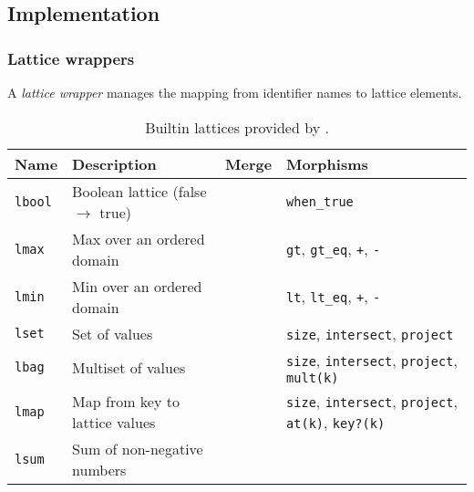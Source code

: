 \subsection{Implementation}

\subsubsection{Lattice wrappers}
A \emph{lattice wrapper} manages the mapping from identifier names to lattice
elements.

\begin{table*}[t]
\begin{tabular}{|l|l|l|l|}
\hline
\textbf{Name} & \textbf{Description} & \textbf{Merge} & \textbf{Morphisms} \\
\hline
\texttt{lbool} & Boolean lattice (false $\to$ true) & & \texttt{when\_true} \\
\texttt{lmax} & Max over an ordered domain & &\texttt{gt},
\texttt{gt\_eq}, \texttt{+}, \texttt{-} \\
\texttt{lmin} & Min over an ordered domain & &\texttt{lt}, \texttt{lt\_eq},
\texttt{+}, \texttt{-} \\
\texttt{lset} & Set of values & &\texttt{size}, \texttt{intersect}, \texttt{project}
\\
\texttt{lbag} & Multiset of values & &\texttt{size}, \texttt{intersect},
\texttt{project}, \texttt{mult(k)}\\
\texttt{lmap} & Map from key to lattice values & &\texttt{size},
\texttt{intersect}, \texttt{project}, \texttt{at(k)}, \texttt{key?(k)} \\
\texttt{lsum} & Sum of non-negative numbers & &\\
\hline
\end{tabular}
\caption{Builtin lattices provided by \lang.}
\label{tbl:builtin-lattices}
\end{table*}